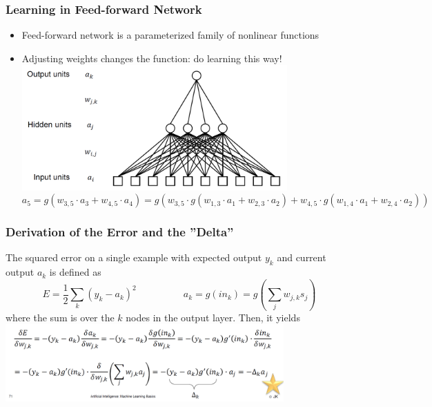 \documentclass[conference]{styles/acmsiggraph}
\begin{document}
\newpage

        \subsubsection{Learning in Feed-forward Network}
            \begin{itemize}
                \item Feed-forward network is a parameterized family of nonlinear functions
                \item Adjusting weights changes the function: do learning this way!\newline
                \includegraphics[width=0.8\textwidth]{imgs/MultiLayerPerceptron.png}
                $$a_5 = g(w_{3,5} \cdot a_3 + w_{4,5} \cdot a_4) = g(w_{3,5} \cdot g(w_{1,3} \cdot a_1 + w_{2,3} \cdot a_2) + w_{4,5} \cdot g(w_{1,4} \cdot a_1 + w_{2,4} \cdot a_2))$$
            \end{itemize}
        
        \subsubsection{Derivation of the Error and the ''Delta''}
            The squared error on a single example with expected output $y_k$ and current output $a_k$ is defined as
            $$E = \frac{1}{2} \sum\limits_{k} (y_k -a_k)^2\ \ \ \ \ \ \ \ \ \ \ \ \ \ \ \ \ \ \ \ \ \ a_k = g(in_k) = g \left( \sum\limits_{j} w_{j,k} s_j \right)$$
            where the sum is over the $k$ nodes in the output layer. Then, it yields\newline
            \includegraphics[width=0.8\textwidth]{imgs/DerivationOfTheErrorAndTheDelta.png}
        
\end{document}
